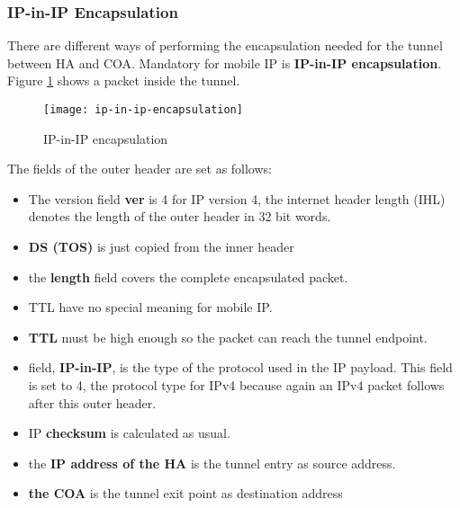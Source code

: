 \subsubsection{IP-in-IP Encapsulation}
There are different ways of performing the encapsulation needed for the tunnel between HA and COA. Mandatory for mobile IP is \textbf{IP-in-IP encapsulation}. Figure \ref{fig:ip_ip_encapsulation} shows a packet inside the tunnel.


\begin{figure}[hb!]
	\centering
	\texttt{[image: ip-in-ip-encapsulation]}
	\caption{IP-in-IP encapsulation}\label{fig:ip_ip_encapsulation}
\end{figure}


The fields of the outer header are set as follows:
\begin{multicols}{2}
	\begin{itemize}
	\item The version field \textbf{ver} is 4 for IP version 4, the internet header length (IHL) denotes the length of the outer header in 32 bit words.
	
	\item \textbf{DS (TOS)} is just copied from the inner header
	
	\item the \textbf{length} field covers the complete encapsulated packet.
	
	\item TTL have no special meaning for mobile IP.
	
	\item \textbf{TTL} must be high enough so the packet can reach the tunnel endpoint.
	
	\item field, \textbf{IP-in-IP}, is the type of the protocol used in the IP payload. This field is set to 4, the protocol type for IPv4 because again an IPv4 packet follows after this outer header.
	
	\item IP \textbf{checksum} is calculated as usual.
	
	\item the \textbf{IP address of the HA} is the tunnel entry as source address.
	
	\item \textbf{the COA} is the tunnel exit point as destination address
\end{itemize}
\end{multicols}

